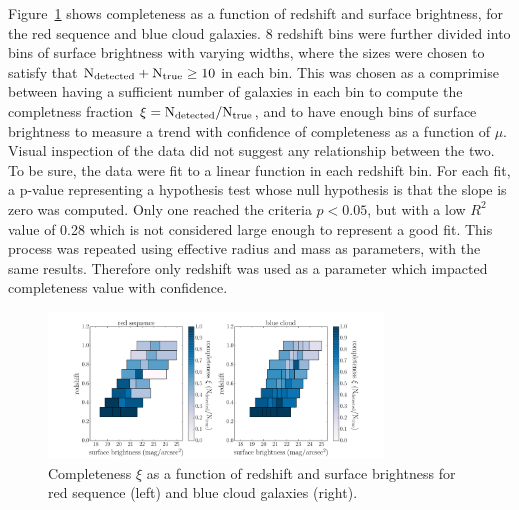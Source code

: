 \documentclass[useAMS,usenatbib]{mn2e}
\begin{document}
Figure~\ref{fig:xi_v_sb} shows completeness as a function of redshift and surface brightness, for the red sequence and blue cloud galaxies. 8 redshift bins were further divided into bins of surface brightness with varying widths, where the sizes were chosen to satisfy that $\rm N_{detected} + N_{true} \ge 10$ in each bin. This was chosen as a comprimise between having a sufficient number of galaxies in each bin to compute the completness fraction $\rm \xi = N_{detected}/N_{true}$, and to have enough bins of surface brightness to measure a trend with confidence of completeness as a function of $\mu$. Visual inspection of the data did not suggest any relationship between the two. To be sure, the data were fit to a linear function in each redshift bin. For each fit, a p-value representing a hypothesis test whose null hypothesis is that the slope is zero was computed. Only one reached the criteria $p<0.05$, but with a low $R^{2}$ value of 0.28 which is not considered large enough to represent a good fit. This process was repeated using effective radius and mass as parameters, with the same results. Therefore only redshift was used as a parameter which impacted completeness value with confidence. 

\begin{figure}
\centering
\includegraphics[width=3.5in,trim={3cm 0cm 3cm 0cm},clip]{figures/xi_v_sb.pdf}
\caption{Completeness $\xi$ as a function of redshift and surface brightness for red sequence (left) and blue cloud galaxies (right).}
\label{fig:xi_v_sb}
\end{figure}
\end{document}
